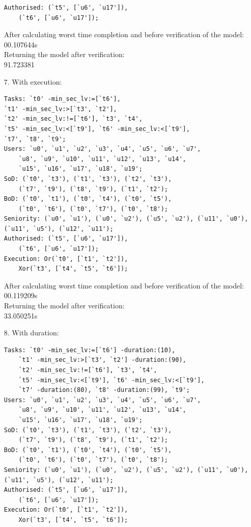 \documentclass[a4paper]{report}
\begin{document}
\begin{enumerate}
\begin{lstlisting}[frame=single]
Authorised: (`t5', [`u6', `u17']), 
	(`t6', [`u6', `u17']);
\end{lstlisting}
After calculating worst time completion and before verification of the model:\\
00.107644s\\
Returning the model after verification: \\
91.723381\\
\item[7.] With execution:
\begin{lstlisting}[frame=single]
Tasks: `t0' -min_sec_lv:=[`t6'], 
`t1' -min_sec_lv:>[`t3', `t2'], 
`t2' -min_sec_lv:!=[`t6'], `t3', `t4', 
`t5' -min_sec_lv:<[`t9'], `t6' -min_sec_lv:<[`t9'], 
`t7', `t8', `t9';
Users: `u0', `u1', `u2', `u3', `u4', `u5', `u6', `u7', 
	`u8', `u9', `u10', `u11', `u12', `u13', `u14', 
	`u15', `u16', `u17', `u18', `u19'; 
SoD: (`t0', `t3'), (`t1', `t3'), (`t2', `t3'), 
	(`t7', `t9'), (`t8', `t9'), (`t1', `t2');
BoD: (`t0', `t1'), (`t0', `t4'), (`t0', `t5'), 
	(`t0', `t6'), (`t0', `t7'), (`t0', `t8');
Seniority: (`u0', `u1'), (`u0', `u2'), (`u5', `u2'), (`u11', `u0'), (`u11', `u5'), (`u12', `u11'); 
Authorised: (`t5', [`u6', `u17']), 
	(`t6', [`u6', `u17']);
Execution: Or(`t0', [`t1', `t2']), 
	Xor(`t3', [`t4', `t5', `t6']); 
\end{lstlisting} 
After calculating worst time completion and before verification of the model:\\
00.119209s\\
Returning the model after verification: \\
33.050251s\\
\item[8.] With duration:
\begin{lstlisting}[frame=single]
Tasks: `t0' -min_sec_lv:=[`t6'] -duration:(10), 
	`t1' -min_sec_lv:>[`t3', `t2'] -duration:(90), 
	`t2' -min_sec_lv:!=[`t6'], `t3', `t4', 
	`t5' -min_sec_lv:<[`t9'], `t6' -min_sec_lv:<[`t9'], 
	`t7' -duration:(80), `t8' -duration:(99), `t9';
Users: `u0', `u1', `u2', `u3', `u4', `u5', `u6', `u7', 
	`u8', `u9', `u10', `u11', `u12', `u13', `u14', 
	`u15', `u16', `u17', `u18', `u19'; 
SoD: (`t0', `t3'), (`t1', `t3'), (`t2', `t3'), 
	(`t7', `t9'), (`t8', `t9'), (`t1', `t2');
BoD: (`t0', `t1'), (`t0', `t4'), (`t0', `t5'), 
	(`t0', `t6'), (`t0', `t7'), (`t0', `t8');
Seniority: (`u0', `u1'), (`u0', `u2'), (`u5', `u2'), (`u11', `u0'), (`u11', `u5'), (`u12', `u11'); 
Authorised: (`t5', [`u6', `u17']), 
	(`t6', [`u6', `u17']);
Execution: Or(`t0', [`t1', `t2']), 
	Xor(`t3', [`t4', `t5', `t6']); 
\end{lstlisting}

\end{enumerate}
\end{document}

